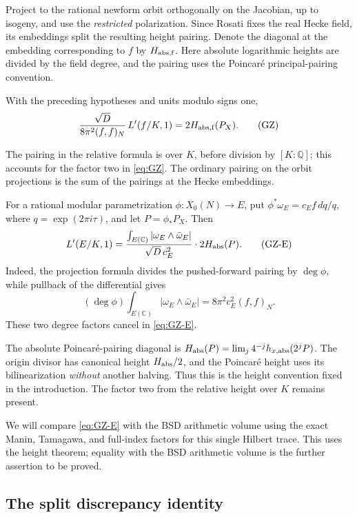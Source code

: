 Project to the rational newform orbit orthogonally on the Jacobian,
up to isogeny, and use the \emph{restricted} polarization. Since
Rosati fixes the real Hecke field, its embeddings split the resulting
height pairing. Denote the diagonal at the embedding corresponding to
\(f\) by \(H_{\rm abs,f}\). Here absolute logarithmic heights are
divided by the field degree, and the pairing uses the Poincaré
principal-pairing convention.

\begin{theorem}\label{thm:classical-gz}
With the preceding hypotheses and units modulo signs one,
\[
 \frac{\sqrt D}{8\pi^2(f,f)_N}\,L'(f/K,1)=2H_{\rm abs,f}(P_X).
 \tag{GZ}\label{eq:GZ}
\]
\end{theorem}
The pairing in the relative formula is over \(K\), before division
by \([K:\mathbb Q]\); this accounts for the factor two in
\eqref{eq:GZ}. The ordinary pairing on the orbit projections is the
sum of the pairings at the Hecke embeddings.

For a rational modular parametrization \(\phi:X_0(N)\to E\), put
\(\phi^*\omega_E=c_E f\,dq/q\), where
\(q=\exp(2\pi i\tau)\), and let \(P=\phi_*P_X\). Then
\[
 L'(E/K,1)=
 \frac{\int_{E(\mathbb C)}|\omega_E\wedge\bar\omega_E|}
 {\sqrt D\,c_E^2}\cdot 2 H_{\rm abs}(P).
 \tag{GZ-E}\label{eq:GZ-E}
\]
Indeed, the projection formula divides the pushed-forward pairing by
\(\deg\phi\), while pullback of the differential gives
\[
 (\deg\phi)\int_{E(\mathbb C)}|\omega_E\wedge\bar\omega_E|
       =8\pi^2c_E^2(f,f)_N.
\]
These two degree factors cancel in \eqref{eq:GZ-E}.

The absolute Poincaré-pairing diagonal is
\(H_{\rm abs}(P)=\lim_j4^{-j}h_{x,\rm abs}(2^jP)\).
The origin divisor has canonical height \(H_{\rm abs}/2\), and
the Poincaré height uses its bilinearization \emph{without} another
halving. Thus this is the height convention fixed in the introduction.
The factor two from the relative height over \(K\) remains present.

We will compare \eqref{eq:GZ-E} with the BSD arithmetic volume using
the exact Manin, Tamagawa, and full-index factors for this single
Hilbert trace. This uses the height theorem; equality with the BSD
arithmetic volume is the further assertion to be proved.

\subsection{The split discrepancy identity}

